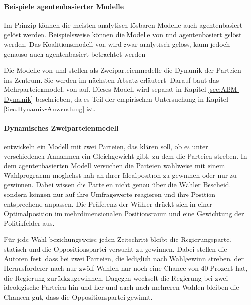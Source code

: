 \paragraph{Beispiele agentenbasierter Modelle}

Im Prinzip können die meisten analytisch lösbaren Modelle auch agentenbasiert gelöst werden. Beispielsweise können die Modelle von \citet{hotelling1929} und \citet{aspremont1979} agentenbasiert gelöst werden.
Das Koalitionsmodell von \citet{laver1990coalitions} wird zwar analytisch gelöst, kann jedoch genauso auch agentenbasiert betrachtet werden.

Die Modelle von \citet{kollman1992adaptive} und \citet{kollman1998political} stellen als Zweiparteienmodelle die Dynamik der Parteien ins Zentrum.
Sie werden im nächsten Absatz erläutert.
Darauf baut das Mehrparteienmodell von \citet{laver2005policy} auf. Dieses Modell wird separat in Kapitel \ref{sec:ABM-Dynamik} beschrieben, da es Teil der empirischen Untersuchung in Kapitel \ref{Sec:Dynamik-Anwendung} ist.

\paragraph{Dynamisches Zweiparteienmodell}

\citet{kollman1992adaptive} entwickeln ein Modell mit zwei Parteien, das klären soll, ob es unter verschiedenen Annahmen ein Gleichgewicht gibt, zu dem die Parteien streben. In dem agentenbasierten Modell versuchen die Parteien wahlweise mit einem Wahlprogramm möglichst nah an ihrer Idealposition zu gewinnen oder nur zu gewinnen. Dabei wissen die Parteien nicht genau über die Wähler Bescheid, sondern können nur auf ihre Umfragewerte reagieren und ihre Position entsprechend anpassen. Die Präferenz der Wähler drückt sich in einer Optimalposition im mehrdimensionalen Positionsraum und eine Gewichtung der Politikfelder aus. 
\citep[S.\,930-1]{kollman1992adaptive}

Für jede Wahl beziehungsweise jeden Zeitschritt bleibt die Regierungspartei statisch und die Oppositionspartei versucht zu gewinnen. Dabei stellen die Autoren fest, dass bei zwei Parteien, die lediglich nach Wahlgewinn streben, der Herausforderer nach nur zwölf Wahlen nur noch eine Chance von 40 Prozent hat, die Regierung zurückzugewinnen. Dagegen wechselt die Regierung bei zwei ideologische Parteien hin und her und auch nach mehreren Wahlen bleiben die Chancen gut, dass die Oppositionspartei gewinnt. \citep[S.\,934-5]{kollman1992adaptive}

